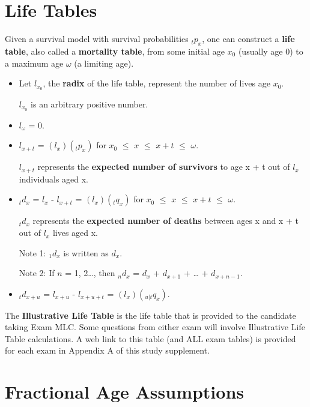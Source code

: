 \documentclass[]{book}
\begin{document}
\section{Life Tables}\label{life-tables}

Given a survival model with survival probabilities \({}_{t}p_x\), one
can construct a \textbf{life table}, also called a \textbf{mortality
table}, from some initial age \(x_0\) (usually age 0) to a maximum age
\(\omega\) (a limiting age).

\begin{itemize}
\item
  Let \(l_{x_0}\), the \textbf{radix} of the life table, represent the
  number of lives age \(x_0\).

  \(l_{x_0}\) is an arbitrary positive number.
\item
  \(l_{\omega}\) = 0.
\item
  \(l_{x + t}\) = \((l_x)({}_{t}p_x)\) for \(x_0\) \(\le\) \(x\) \(\le\)
  \(x + t\) \(\le\) \(\omega\).

  \(l_{x + t}\) represents the \textbf{expected number of survivors} to
  age x + t out of \(l_x\) individuals aged x.
\item
  \({}_{t}d_x\) = \(l_x\) - \(l_{x + t}\) = \((l_x)({}_{t}q_x)\) for
  \(x_0\) \(\le\) \(x\) \(\le\) \(x + t\) \(\le\) \(\omega\).

  \({}_{t}d_x\) represents the \textbf{expected number of deaths}
  between ages x and x + t out of \(l_x\) lives aged x.

  Note 1: \({}_{1}d_x\) is written as \(d_x\).

  Note 2: If \(n\) = 1, 2\ldots{}, then \({}_{n}d_x\) = \(d_x\) +
  \(d_{x + 1}\) + \ldots{} + \(d_{x + n - 1}\).
\item
  \({}_{t}d_{x + u}\) = \(l_{x + u}\) - \(l_{x + u + t}\) =
  \((l_x)({}_{u|t}q_x)\).
\end{itemize}

The \textbf{Illustrative Life Table} is the life table that is provided
to the candidate taking Exam MLC. Some questions from either exam will
involve Illustrative Life Table calculations. A web link to this table
(and ALL exam tables) is provided for each exam in Appendix A of this
study supplement.

\section{Fractional Age Assumptions}\label{fractional-age-assumptions}
\end{document}

